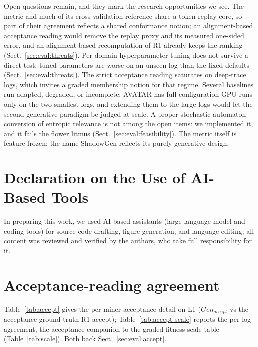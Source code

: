 \documentclass[runningheads]{llncs}
\newcommand{\genaccept}{\ensuremath{\mathit{Gen}_{\mathit{accept}}}}
\begin{document}
Open questions remain, and they mark the research opportunities we see. The metric and much of its cross-validation reference share a token-replay core, so part of their agreement reflects a shared conformance notion; an alignment-based acceptance reading would remove the replay proxy and its measured one-sided error, and an alignment-based recomputation of R1 already keeps the ranking (Sect.~\ref{sec:eval:threats}). Per-domain hyperparameter tuning does not survive a direct test: tuned parameters are worse on an unseen log than the fixed defaults (Sect.~\ref{sec:eval:threats}). The strict acceptance reading saturates on deep-trace logs, which invites a graded membership notion for that regime. Several baselines run adapted, degraded, or incomplete; AVATAR has full-configuration GPU runs only on the two smallest logs, and extending them to the large logs would let the second generative paradigm be judged at scale. A proper stochastic-automaton conversion of entropic relevance is not among the open items: we implemented it, and it fails the flower litmus (Sect.~\ref{sec:eval:feasibility}). The metric itself is feature-frozen; the name ShadowGen reflects its purely generative design.

\section*{Declaration on the Use of AI-Based Tools}
In preparing this work, we used AI-based assistants (large-language-model and coding
tools) for source-code drafting, figure generation, and language editing; all content
was reviewed and verified by the authors, who take full responsibility for it.

\appendix
\section{Acceptance-reading agreement}
\label{sec:appendix:accept}
Table~\ref{tab:accept} gives the per-miner acceptance detail on L1 (\genaccept{} vs the acceptance ground truth R1-accept); Table~\ref{tab:accept-scale} reports the per-log agreement, the acceptance companion to the graded-fitness scale table (Table~\ref{tab:scale}). Both back Sect.~\ref{sec:eval:accept}.
\end{document}
